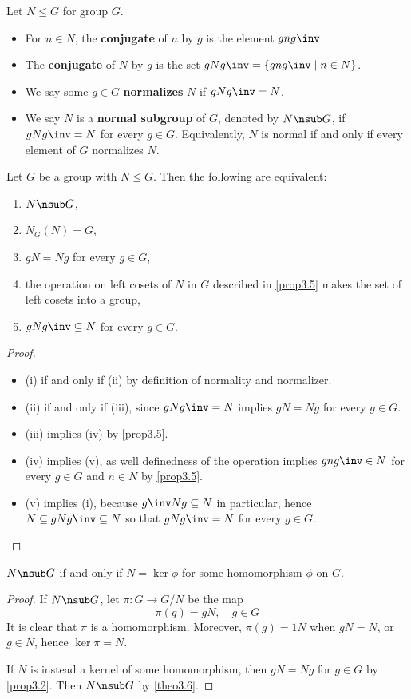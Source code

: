  Let $N \leq G$ for group $G$.
\begin{itemize}
    \item For $n \in N$, the \textbf{conjugate} of $n$ by $g$ is the element $gng\inv$.
    \item The \textbf{conjugate} of $N$ by $g$ is the set $gNg\inv = \{gng\inv \mid n \in N\}$.
    \item We say some $g \in G$ \textbf{normalizes} $N$ if $gNg\inv = N$.
    \item We say $N$ is a \textbf{normal subgroup} of $G$, denoted by $N \nsub G$, if $gNg\inv = N$ for every $g \in G$. Equivalently, $N$ is normal if and only if every element of $G$ normalizes $N$.
\end{itemize}

 \label{theo3.6}
Let $G$ be a group with $N \leq G$. Then the following are equivalent:
\begin{enumerate}
    \item $N \nsub G$,
    \item $N_G(N) = G$,
    \item $gN = Ng$ for every $g \in G$,
    \item the operation on left cosets of $N$ in $G$ described in \autoref{prop3.5} makes the set of left cosets into a group,
    \item $gNg\inv \subseteq N$ for every $g \in G$.
\end{enumerate}

\begin{proof}
    \leavevmode
    \begin{itemize}
        \item (i) if and only if (ii) by definition of normality and normalizer.
        \item (ii) if and only if (iii), since $gNg\inv = N$ implies $gN = Ng$ for every $g \in G$.
        \item (iii) implies (iv) by \autoref{prop3.5}.
        \item (iv) implies (v), as well definedness of the operation implies $gng\inv \in N$ for every $g \in G$ and $n \in N$ by \autoref{prop3.5}.
        \item (v) implies (i), because $g\inv Ng \subseteq N$ in particular, hence $N \subseteq gNg\inv \subseteq N$ so that $gNg\inv = N$ for every $g \in G$.
    \end{itemize}
\end{proof}

 \label{prop3.7}
$N \nsub G$ if and only if $N = \ker\phi$ for some homomorphism $\phi$ on $G$.
\begin{proof}
    If $N \nsub G$, let $\pi : G \to G/N$ be the map
    \[\pi(g) = gN, \quad g \in G\]
    It is clear that $\pi$ is a homomorphism. Moreover, $\pi(g) = 1N$ when $gN = N$, or $g \in N$, hence $\ker\pi = N$.

    If $N$ is instead a kernel of some homomorphism, then $gN = Ng$ for $g \in G$ by \autoref{prop3.2}. Then $N \nsub G$ by \autoref{theo3.6}.
\end{proof}

